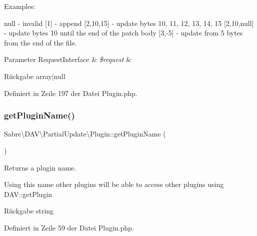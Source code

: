 Examples\+:

null -\/ invalid \mbox{[}1\mbox{]} -\/ append \mbox{[}2,10,15\mbox{]} -\/ update bytes 10, 11, 12, 13, 14, 15 \mbox{[}2,10,null\mbox{]} -\/ update bytes 10 until the end of the patch body \mbox{[}3,-\/5\mbox{]} -\/ update from 5 bytes from the end of the file.


\begin{DoxyParams}[1]{Parameter}
Request\+Interface & {\em \$request} & \\
\hline
\end{DoxyParams}
\begin{DoxyReturn}{Rückgabe}
array$\vert$null 
\end{DoxyReturn}


Definiert in Zeile 197 der Datei Plugin.\+php.

\mbox{\label{class_sabre_1_1_d_a_v_1_1_partial_update_1_1_plugin_aab2b6f5f359e998c446f37352cc5b3ff}} 
\subsubsection{\texorpdfstring{get\+Plugin\+Name()}{getPluginName()}}
{\footnotesize\ttfamily Sabre\textbackslash{}\+D\+A\+V\textbackslash{}\+Partial\+Update\textbackslash{}\+Plugin\+::get\+Plugin\+Name (\begin{DoxyParamCaption}{ }\end{DoxyParamCaption})}

Returns a plugin name.

Using this name other plugins will be able to access other plugins using D\+AV\+::get\+Plugin

\begin{DoxyReturn}{Rückgabe}
string 
\end{DoxyReturn}


Definiert in Zeile 59 der Datei Plugin.\+php.

\mbox{\label{class_sabre_1_1_d_a_v_1_1_partial_update_1_1_plugin_ab1948fb90473cb138f0ee10d1431e9ed}} 
